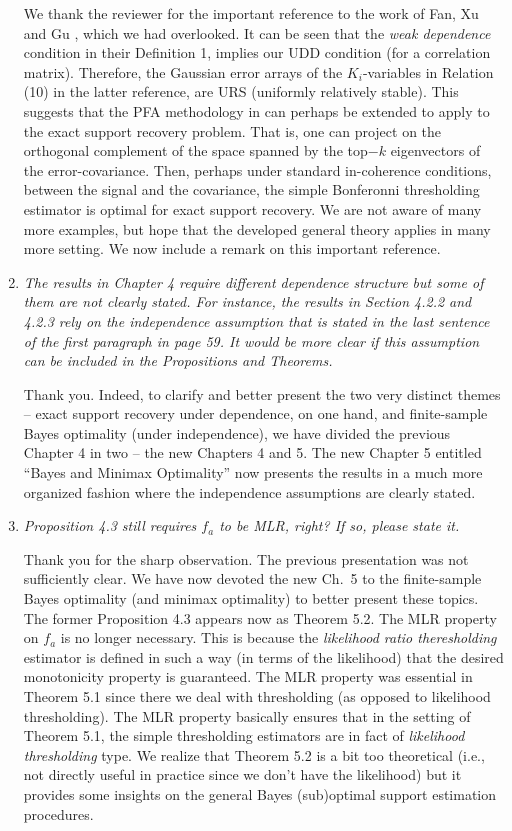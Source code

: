 \documentclass[11pt]{article}
\begin{document}
\begin{enumerate}
   We thank the reviewer for the important reference to the work of Fan, Xu and Gu \cite{fan:xu:gu:2012}, which we had overlooked.  
   It can be seen that the {\em weak dependence} condition in their Definition 1, implies our UDD condition (for a correlation matrix).  
   Therefore, the Gaussian error arrays of the $K_i$-variables in Relation (10) in the latter reference, are URS (uniformly relatively stable).  
   This suggests that the PFA methodology in \cite{fan:xu:gu:2012} can perhaps be extended to apply to the exact support recovery problem.  
   That is, one can project on the orthogonal complement of the space spanned by the top$-k$ eigenvectors of the error-covariance.  Then, perhaps 
   under standard in-coherence conditions, between the  signal and the covariance, the simple Bonferonni thresholding estimator is optimal for exact 
   support recovery.  We are not aware of many more examples, but hope that the developed general theory applies in many more setting.  We now 
   include a remark on this important reference.
   
   
   \item  {\em The results in Chapter 4 require different dependence structure but some of them are not clearly stated. For instance, the results in Section 4.2.2 and 4.2.3 rely on the independence assumption that is stated in the last sentence of the first paragraph in page 59. It would be more clear if this assumption can be included in the Propositions and Theorems.}
   
   Thank you.  Indeed, to clarify and better present the two very distinct themes -- exact support recovery under dependence, on one hand, and 
   finite-sample Bayes optimality (under independence), we have divided the previous Chapter 4 in two -- the new Chapters 4 and 5. The new
   Chapter 5 entitled ``Bayes and Minimax Optimality'' now presents the results in a much more organized fashion where the independence 
   assumptions are clearly stated. 
    
   \item {\em Proposition 4.3 still requires $f_a$ to be MLR, right? If so, please state it.}
   
   Thank you for the sharp observation.  The previous presentation was not sufficiently clear.  We have now devoted the new Ch.\ 5 to the
   finite-sample Bayes optimality (and minimax optimality) to better present these topics.  
   The former Proposition 4.3 appears now as Theorem 5.2.  The MLR property on $f_a$
   is no longer necessary.  This is because the {\em likelihood ratio theresholding} estimator is defined in such a way (in terms of the likelihood) that
   the desired monotonicity property is guaranteed.  The MLR property was essential in Theorem 5.1 since there we deal with thresholding (as opposed to
   likelihood thresholding). The MLR property basically ensures that in the setting of Theorem 5.1, the simple thresholding estimators are in fact of
   {\em likelihood thresholding} type.  We realize that Theorem 5.2 is a bit too theoretical (i.e., not directly useful in practice since we don't have the 
   likelihood) but it provides some insights on
   the general Bayes (sub)optimal support estimation procedures.
   

\end{enumerate}
\end{document}
